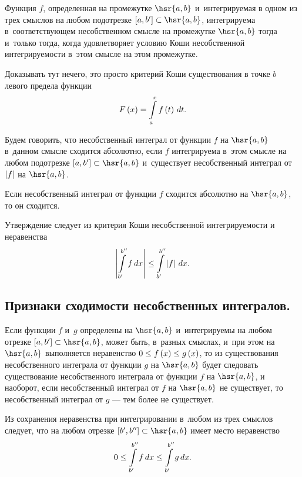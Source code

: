 \documentclass[draft]{article}
\begin{document}
\ut

Функция $f$, определенная на промежутке $\hsr{a, b}$
и~интегрируемая в одном из трех смыслов на любом подотрезке
$\seg[a,b']\subset\hsr{a, b}$, интегрируема в~соответствующем
несобственном смысле на промежутке $\hsr{a, b}$ тогда и~только
тогда, когда удовлетворяет условию Коши несобственной
интегрируемости в~этом смысле на этом промежутке.

\pr

Доказывать тут нечего, это просто критерий Коши существования в
точке $b$ левого предела функции $$F\atx=\intd[a,x]f\at(t),t.$$

\prut

\bigskip

\df Будем говорить, что несобственный интеграл от функции $f$ на
$\hsr{a, b}$ в~данном смысле сходится абсолютно, если $f$
интегрируема в~этом смысле на любом подотрезке
$\seg[a,b']\subset\hsr{a, b}$ и~существует несобственный интеграл
от $\left|f\right|$ на $\hsr{a, b}$.

\bigskip

\ut

Если несобственный интеграл от функции $f$ сходится абсолютно на
$\hsr{a, b}$, то он сходится.

\pr

Утверждение следует из критерия Коши несобственной интегрируемости и
неравенства $$\abs{\intd[b',b'']f,x}\le\intd[b',b'']\abs{f},x.$$

\prut

\subsection{Признаки сходимости несобственных интегралов.}


Если функции $f$ и~$g$ определены на $\hsr{a, b}$ и~интегрируемы на
любом отрезке $\seg[a,b']\subset\hsr{a, b}$, может быть, в~разных
смыслах, и~при этом на $\hsr{a, b}$ выполняется неравенство $0\le
f\atx \le g\atx$, то из существования несобственного интеграла от
функции $g$ на $\hsr{a, b}$ будет следовать существование
несобственного интеграла от функции $f$ на $\hsr{a, b}$, и
наоборот, если несобственный интеграл от $f$ на $\hsr{a, b}$ не
существует, то несобственный интеграл от $g$ --- тем более не
существует.

\eject

\pr

Из сохранения неравенства при интегрировании в~любом из трех смыслов
следует, что на любом отрезке $\seg[b',b'']\subset\hsr{a, b}$ имеет
место неравенство $$0\le\intd[b',b'']f,x\le\intd[b',b'']g,x.$$
\end{document}
